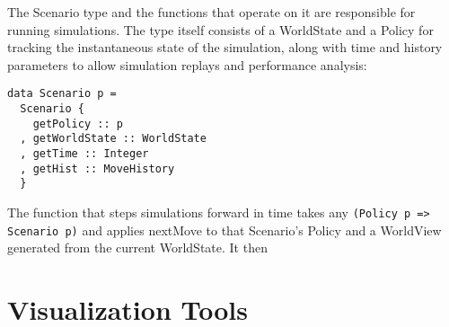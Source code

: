The Scenario type and the functions that operate on it are responsible for running simulations. The type itself consists of a WorldState and a Policy for tracking the instantaneous state of the simulation, along with time and history parameters to allow simulation replays and performance analysis:

\begin{verbatim}
data Scenario p =
  Scenario {
    getPolicy :: p
  , getWorldState :: WorldState
  , getTime :: Integer
  , getHist :: MoveHistory
  }
\end{verbatim}

The function that steps simulations forward in time takes any \verb|(Policy p => Scenario p)| and applies nextMove to that Scenario's Policy and a WorldView generated from the current WorldState. It then 

\section{Visualization Tools}

